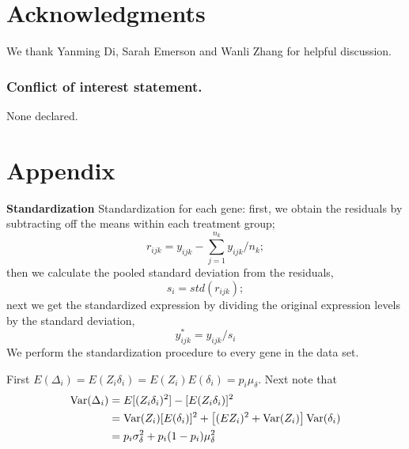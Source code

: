 \documentclass[a4,center,fleqn]{NAR}
\begin{document}
	
	
	
	
	
	\section{Acknowledgments}\label{section:acknowledgment}
	
	We thank Yanming Di, Sarah Emerson and Wanli Zhang for helpful discussion. 
	
	
	\subsubsection{Conflict of interest statement.} None declared.
	
	\newpage
	
		\section*{Appendix}\label{section:appendix}
		
		
		\textbf{Standardization} 
		Standardization for each gene: first, we obtain the residuals by subtracting off the means within
		each treatment group;
		\begin{equation}
			r_{ijk} = y_{ijk} - \sum_{j=1}^{n_k}{y}_{ijk}/n_k;
		\end{equation}
		then we calculate the pooled standard deviation from the residuals,
		\begin{equation}
			s_i = \textit{std}(r_{ijk});
		\end{equation}
		next we get the standardized expression by dividing the original expression levels by the
		standard deviation,
		\begin{equation}
			y^{\ast}_{ijk} = y_{ijk}/s_i
		\end{equation}
		We perform the standardization procedure to every gene in the data set. 
		
		
		First $E(\Delta_i) = E(Z_i\delta_i) = E(Z_i)E(\delta_i) = p_i\mu_{\delta}$. Next note that  
		\begin{equation}\notag
			\begin{aligned}
				\text{Var}(\Delta_i) & = E[(Z_i\delta_i)^2]- [E(Z_i\delta_i)]^2 \\
				& = \text{Var}(Z_i)[E(\delta_i)]^2 + \left[(EZ_i)^2 + \text{Var}(Z_i)\right]\text{Var}(\delta_i) \\
				& =p_i\sigma_{\delta}^2 + p_i(1-p_i)\mu_{\delta}^2
			\end{aligned}
		\end{equation}
		
\end{document}
